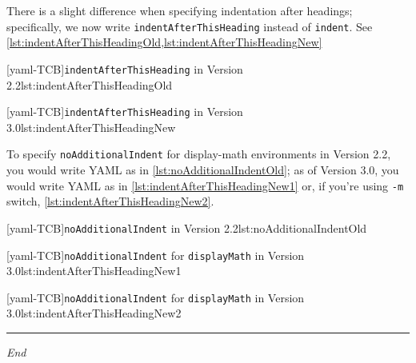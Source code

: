 	 There is a slight difference when specifying indentation after headings; specifically, we
	 now write \texttt{indentAfterThisHeading} instead of \texttt{indent}. See
	 \cref{lst:indentAfterThisHeadingOld,lst:indentAfterThisHeadingNew}

	 \begin{minipage}{.45\textwidth}
		 [yaml-TCB]{\texttt{indentAfterThisHeading} in Version 2.2}{lst:indentAfterThisHeadingOld}
	 \end{minipage}%
	 \hfill
	 \begin{minipage}{.45\textwidth}
		 [yaml-TCB]{\texttt{indentAfterThisHeading} in Version 3.0}{lst:indentAfterThisHeadingNew}
	 \end{minipage}%

	 To specify \texttt{noAdditionalIndent} for display-math environments in Version 2.2, you would
	 write YAML as in \cref{lst:noAdditionalIndentOld}; as of Version 3.0, you would write YAML as in
	 \cref{lst:indentAfterThisHeadingNew1} or, if you're using \texttt{-m} switch,
	 \cref{lst:indentAfterThisHeadingNew2}.

	 \begin{minipage}{.45\textwidth}
		 [yaml-TCB]{\texttt{noAdditionalIndent} in Version 2.2}{lst:noAdditionalIndentOld}
	 \end{minipage}%
	 \hfill
	 \begin{minipage}{.45\textwidth}
		 [yaml-TCB]{\texttt{noAdditionalIndent} for \texttt{displayMath} in Version 3.0}{lst:indentAfterThisHeadingNew1}

		 [yaml-TCB]{\texttt{noAdditionalIndent} for \texttt{displayMath} in Version 3.0}{lst:indentAfterThisHeadingNew2}
	 \end{minipage}%

	 \mbox{}\hfill	  \begin{minipage}{.25\textwidth}
		 \hrule

		 \hfill\itshape End\\\mbox{}\hfill\mbox{}

	 \end{minipage}
